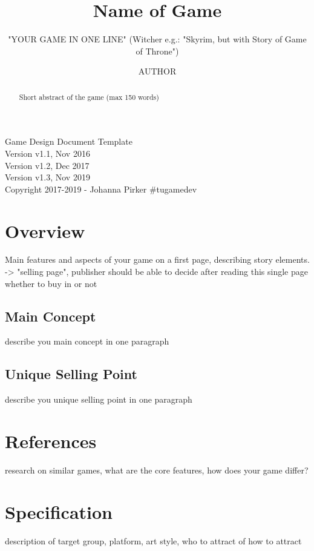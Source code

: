 \documentclass[a4paper]{scrreprt}
\title{Name of Game}
\subtitle{"YOUR GAME IN ONE LINE" (Witcher e.g.: "Skyrim, but with Story of Game of Throne")}
\author{AUTHOR}
\begin{document}
\maketitle

\null\vfill
\noindent
Game Design Document Template\\ 
Version v1.1, Nov 2016\\
Version v1.2, Dec 2017\\
Version v1.3, Nov 2019\\
Copyright 2017-2019 - Johanna Pirker \#tugamedev\\
\newpage

\begin{abstract}
Short abstract of the game (max 150 words) 
\end{abstract}

\tableofcontents

\chapter{Overview}

Main features and aspects of your game on a first page, describing story elements. -> "selling page", publisher should be able to decide after reading this single page whether to buy in or not 

\section{Main Concept}
describe you main concept in one paragraph

\section{Unique Selling Point}
describe you unique selling point in one paragraph



\chapter{References} 
research on similar games, what are the core features, how does your game differ?


\chapter{Specification}
description of target group, platform, art style, who to attract of how to attract 
\end{document}
